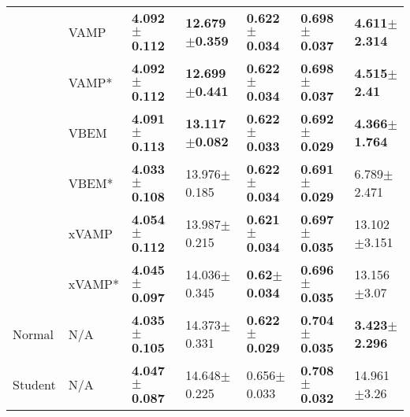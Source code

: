 \begin{tabular}{lllllll}
        & VAMP &  \textbf{4.092$\pm$0.112} &  \textbf{12.679$\pm$0.359} &  \textbf{0.622$\pm$0.034} &  \textbf{0.698$\pm$0.037} &  \textbf{4.611$\pm$2.314} \\
        & VAMP* &  \textbf{4.092$\pm$0.112} &  \textbf{12.699$\pm$0.441} &  \textbf{0.622$\pm$0.034} &  \textbf{0.698$\pm$0.037} &   \textbf{4.515$\pm$2.41} \\
        & VBEM &  \textbf{4.091$\pm$0.113} &  \textbf{13.117$\pm$0.082} &  \textbf{0.622$\pm$0.033} &  \textbf{0.692$\pm$0.029} &  \textbf{4.366$\pm$1.764} \\
        & VBEM* &  \textbf{4.033$\pm$0.108} &           13.976$\pm$0.185 &  \textbf{0.622$\pm$0.034} &  \textbf{0.691$\pm$0.029} &           6.789$\pm$2.471 \\
        & xVAMP &  \textbf{4.054$\pm$0.112} &           13.987$\pm$0.215 &  \textbf{0.621$\pm$0.034} &  \textbf{0.697$\pm$0.035} &          13.102$\pm$3.151 \\
        & xVAMP* &  \textbf{4.045$\pm$0.097} &           14.036$\pm$0.345 &   \textbf{0.62$\pm$0.034} &  \textbf{0.696$\pm$0.035} &           13.156$\pm$3.07 \\
Normal & N/A &  \textbf{4.035$\pm$0.105} &           14.373$\pm$0.331 &  \textbf{0.622$\pm$0.029} &  \textbf{0.704$\pm$0.035} &  \textbf{3.423$\pm$2.296} \\
Student & N/A &  \textbf{4.047$\pm$0.087} &           14.648$\pm$0.225 &           0.656$\pm$0.033 &  \textbf{0.708$\pm$0.032} &           14.961$\pm$3.26 \\
\bottomrule
\end{tabular}

